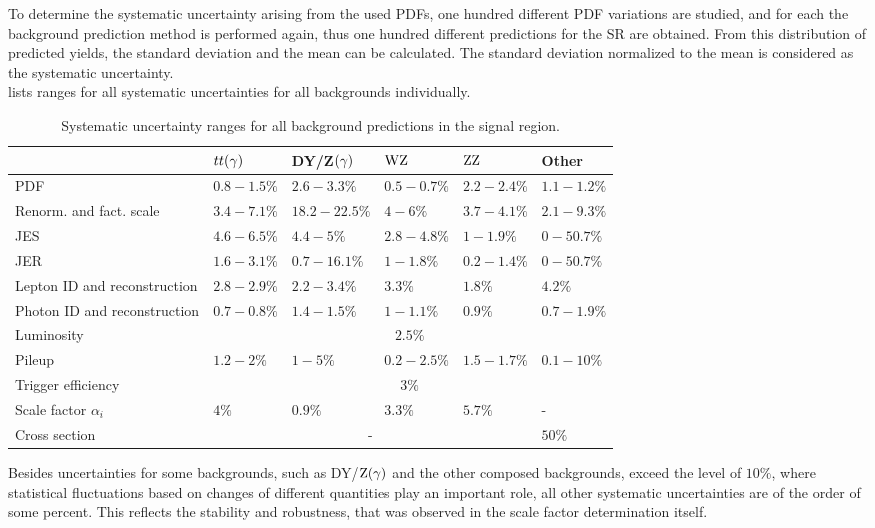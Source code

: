 To determine the systematic uncertainty arising from the used PDFs, one hundred different PDF variations are studied, and for each the background prediction method is performed again, thus one hundred different predictions for the SR are obtained. From this distribution of predicted yields, the standard deviation and the mean can be calculated. The standard deviation normalized to the mean is considered as the systematic uncertainty.\\
 lists ranges for all systematic uncertainties for all backgrounds individually.
\begin{table}[tbp]
 \centering
 \caption{Systematic uncertainty ranges for all background predictions in the signal region.}
 \small
 \label{tab:systuncBKG}
 \begin{tabular}[width=\textwidth]{llllll}
                               & $tt(\gamma)$                  & DY/Z$(\gamma)$  & $\mathrm{W}\mathrm{Z}$    & $\mathrm{Z}\mathrm{Z}$    & Other       \\\hline
  PDF                          & $0.8-1.5\%$                 & $2.6-3.3\%$   & $0.5-0.7\%$ & $2.2-2.4\%$ & $1.1-1.2\%$ \\
  Renorm. and fact. scale      & $3.4-7.1\%$                 & $18.2-22.5\%$ & $4-6\%$     & $3.7-4.1\%$ & $2.1-9.3\%$ \\
  JES                          & $4.6-6.5\%$                 & $4.4-5\%$     & $2.8-4.8\%$ & $1-1.9\%$   & $0-50.7\%$  \\
  JER                          & $1.6-3.1\%$                 & $0.7-16.1\%$  & $1-1.8\%$   & $0.2-1.4\%$ & $0-50.7\%$  \\
  Lepton ID and reconstruction & $2.8-2.9\%$                 & $2.2-3.4\%$   & $3.3\%$     & $1.8\%$     & $4.2\%$     \\
  Photon ID and reconstruction & $0.7-0.8\%$                 & $1.4-1.5\%$   & $1-1.1\%$   & $0.9\%$     & $0.7-1.9\%$ \\
  Luminosity                   & \multicolumn{5}{c}{$2.5\%$}                                                           \\
  Pileup                       & $1.2-2\%$                   & $1-5\%$       & $0.2-2.5\%$ & $1.5-1.7\%$ & $0.1-10\%$  \\
  Trigger efficiency           & \multicolumn{5}{c}{$3\%$}                                                             \\
  Scale factor $\alpha_{i}$    & $4\%$                       & $0.9\%$       & $3.3\%$     & $5.7\%$     & -           \\
  Cross section                & \multicolumn{4}{c}{-}       & $50\%$                                                  \\
  \hline
 \end{tabular}
\end{table}
Besides uncertainties for some backgrounds, such as DY/$\mathrm{Z}(\gamma)$ and the other composed backgrounds, exceed the level of $10\%$, where statistical fluctuations based on changes of different quantities play an important role, all other systematic uncertainties are of the order of some percent. This reflects the stability and robustness, that was observed in the scale factor determination itself.


